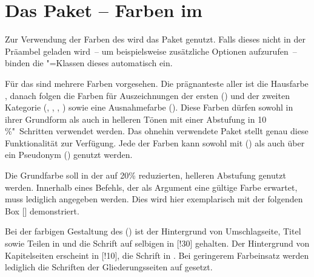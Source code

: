 \section{Das Paket  -- Farben im \CD}%
%
%
%
\begin{Bundle*}{}
Zur Verwendung der Farben des \CDs wird das Paket  
genutzt. Falls dieses nicht in der Präambel geladen wird~-- um beispielsweise 
zusätzliche Optionen aufzurufen~-- binden die \TUDScript"=Klassen dieses 
automatisch ein.

Für das \CD sind mehrere Farben vorgesehen. Die prägnanteste aller ist die 
Hausfarbe , danach folgen die Farben für Auszeichnungen der ersten
() und der zweiten Kategorie (, , 
, ) sowie eine Ausnahmefarbe (). 
Diese Farben dürfen sowohl in ihrer Grundform als auch in helleren Tönen mit 
einer Abstufung in 10\,\%"~Schritten verwendet werden. Das ohnehin verwendete 
Paket  stellt genau diese Funktionalität zur Verfügung. Jede 
der Farben kann sowohl mit () als auch über ein 
Pseudonym () genutzt werden.
%
\begin{Example*}
Die Grundfarbe  soll in der auf 20\% reduzierten, helleren 
Abstufung genutzt werden. Innerhalb eines Befehls, der als Argument eine 
gültige Farbe erwartet, muss lediglich  angegeben werden. 
Dies wird hier exemplarisch mit der folgenden \colorbox{HKS44!20}{%
  Box []%
} demonstriert.
\end{Example*}
%
Bei der farbigen Gestaltung des \CDs () ist der Hintergrund 
von Umschlagseite, Titel sowie Teilen in  und die Schrift auf 
selbigen in [!30] gehalten. Der Hintergrund von Kapitelseiten 
erscheint in [!10], die Schrift in . Bei geringerem 
Farbeinsatz werden lediglich die Schriften der Gliederungsseiten auf 
 gesetzt.


\end{Bundle*}
